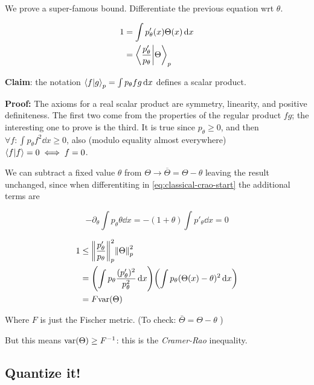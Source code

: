 We prove a super-famous bound. Differentiate the previous equation wrt \( \theta \).

\begin{subequations}\label{eq:classical-crao-start}
\begin{align}
  1 &= \int  p' _\theta (x) \Theta (x) \dd{x}   \\
  &= \braket{\frac{p'_\theta}{p_\theta}}{\Theta}_p \label{eq:classical-crao-start-subeq}
\end{align}
\end{subequations}

\textbf{Claim}: the notation \( \braket{f}{g}_p = \int  p_\theta f g \dd{x}  \) defines a scalar product.

\begin{greenbox}
  \textbf{Proof: }
  The axioms for a real scalar product are symmetry, linearity, and positive definiteness. The first two come from the properties of the regular product \(fg\); the interesting one to prove is the third. It is true since \(p_ \theta \geq 0\), and then \(\forall f: \int  p_ \theta f^2  \dd{x} \geq 0 \), also (modulo equality almost everywhere) \(\braket{f}{f}=0 \iff f=0\).
\end{greenbox}

We can subtract a fixed value \( \theta \) from \(\Theta \rightarrow \overline{\Theta} = \Theta - \theta \) leaving the result unchanged, since when differentiting in  \eqref{eq:classical-crao-start} the additional terms are

\begin{equation}
  -\partial _ \theta \int  p_ \theta \theta \dd{x} = - (1 + \theta) \int  p' _ \theta \dd{x} = 0
\end{equation}

\begin{align}
  1 &\leq \norm{\frac{p_\theta '}{p_\theta}}^{2}_p \norm{\Theta}^2_p  \\
  &= \qty(\int  p_\theta \frac{(p_\theta ')^2}{p_\theta^2} \dd{x} )
  \qty(\int p_\theta (\Theta(x) - \theta)^2 \dd{x} )  \\
  &= F \text{var} \qty(\Theta)
\end{align}

Where \( F \) is just the Fischer metric. (To check: \( \bar{\Theta} = \Theta - \theta \) )

But this means \(\text{var} \qty(\Theta) \geq F ^{-1} \): this is the \emph{Cramer-Rao} inequality.

\subsection{Quantize it!}

